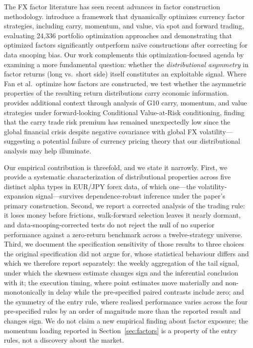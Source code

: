 \documentclass[11pt]{article}
\begin{document}
The FX factor literature has seen recent advances in factor construction methodology. \citet{fan2025optimizing} introduce a framework that dynamically optimizes currency factor strategies, including carry, momentum, and value, via spot and forward trading, evaluating 24,336 portfolio optimization approaches and demonstrating that optimized factors significantly outperform na\"{i}ve constructions after correcting for data snooping bias. Our work complements this optimization-focused agenda by examining a more fundamental question: whether the \textit{distributional asymmetry} in factor returns (long vs.\ short side) itself constitutes an exploitable signal. Where Fan et al.\ optimize how factors are constructed, we test whether the asymmetric properties of the resulting return distributions carry economic information. \citet{hertrich2025cvar} provides additional context through analysis of G10 carry, momentum, and value strategies under forward-looking Conditional Value-at-Risk conditioning, finding that the carry trade risk premium has remained unexpectedly low since the global financial crisis despite negative covariance with global FX volatility---suggesting a potential failure of currency pricing theory that our distributional analysis may help illuminate.

Our empirical contribution is threefold, and we state it narrowly. First, we provide a systematic characterization of distributional properties across five distinct alpha types in EUR/JPY forex data, of which one---the volatility-expansion signal---survives dependence-robust inference under the paper's primary construction. Second, we report a corrected analysis of the trading rule: it loses money before frictions, walk-forward selection leaves it nearly dormant, and data-snooping-corrected tests do not reject the null of no superior performance against a zero-return benchmark across a twelve-strategy universe. Third, we document the specification sensitivity of those results to three choices the original specification did not argue for, whose statistical behaviour differs and which we therefore report separately: the weekly aggregation of the tail signal, under which the skewness estimate changes sign and the inferential conclusion with it; the execution timing, where point estimates move materially and non-monotonically in delay while the pre-specified paired contrasts include zero; and the symmetry of the entry rule, where realised performance varies across the four pre-specified rules by an order of magnitude more than the reported result and changes sign. We do not claim a new empirical finding about factor exposure; the momentum loading reported in Section~\ref{sec:factors} is a property of the entry rules, not a discovery about the market.
\end{document}
